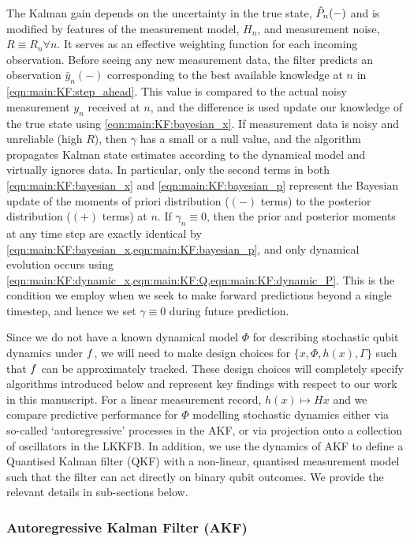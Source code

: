 The Kalman gain depends on the uncertainty in the true state, $\hat{P}_{n}(-)$ and is modified by features of the measurement model, $H_n$, and measurement noise, $R\equiv R_n \forall n$. It serves as an effective weighting function for each incoming observation.  Before seeing any new measurement data, the filter predicts an observation $\hat{y}_n(-)$ corresponding to the best available knowledge at $n$ in \cref{eqn:main:KF:step_ahead}. This value is compared to the actual noisy measurement $y_n$ received at $n$, and the difference is used update our knowledge of the true state using \cref{eqn:main:KF:bayesian_x}. If measurement data is noisy and unreliable (high $R$), then $\gamma$ has a small or a null value, and the algorithm propagates Kalman state estimates according to the dynamical model and virtually ignores data. In particular, only the second terms in both \cref{eqn:main:KF:bayesian_x} and \cref{eqn:main:KF:bayesian_p} represent the Bayesian update of the moments of priori distribution ($(-)$ terms) to the posterior distribution ($(+)$ terms) at $n$. If $\gamma_n \equiv 0$, then the prior and posterior moments at any time step are exactly identical by \cref{eqn:main:KF:bayesian_x,eqn:main:KF:bayesian_p}, and only dynamical evolution occurs using \cref{eqn:main:KF:dynamic_x,eqn:main:KF:Q,eqn:main:KF:dynamic_P}.  This is the condition we employ when we seek to make forward predictions beyond a single timestep, and hence we set $\gamma \equiv 0$ during future prediction.

Since we do not have a known dynamical model $\Phi$ for describing stochastic qubit dynamics under $f$, we will need to make design choices for  $\{ x, \Phi, h(x), \Gamma \}$  such that $f$ can be approximately tracked. These design choices will completely specify algorithms introduced below and represent key findings with respect to our work in this manuscript. For a linear measurement record, $h(x) \mapsto Hx$ and we compare predictive performance for $\Phi$ modelling stochastic dynamics either via so-called `autoregressive' processes in the AKF, or via projection onto a collection of oscillators in the LKKFB.  In addition, we use the dynamics of AKF to define a Quantised Kalman filter (QKF) with a non-linear, quantised measurement model such that the filter can act directly on binary qubit outcomes. We provide the relevant details in sub-sections below. 
 


\subsubsection{Autoregressive Kalman Filter (AKF)}

